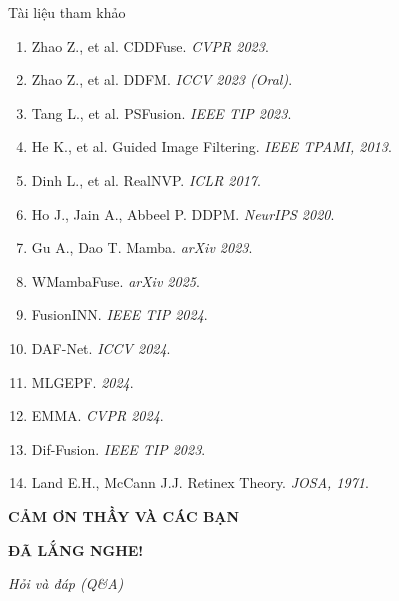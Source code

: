 \documentclass{beamer}
\begin{document}
\begin{frame}{Tài liệu tham khảo}
    \footnotesize
    \begin{enumerate}
        \item Zhao Z., et al. CDDFuse. \textit{CVPR 2023}.
        \item Zhao Z., et al. DDFM. \textit{ICCV 2023 (Oral)}.
        \item Tang L., et al. PSFusion. \textit{IEEE TIP 2023}.
        \item He K., et al. Guided Image Filtering. \textit{IEEE TPAMI, 2013}.
        \item Dinh L., et al. RealNVP. \textit{ICLR 2017}.
        \item Ho J., Jain A., Abbeel P. DDPM. \textit{NeurIPS 2020}.
        \item Gu A., Dao T. Mamba. \textit{arXiv 2023}.
        \item WMambaFuse. \textit{arXiv 2025}.
        \item FusionINN. \textit{IEEE TIP 2024}.
        \item DAF-Net. \textit{ICCV 2024}.
        \item MLGEPF. \textit{2024}.
        \item EMMA. \textit{CVPR 2024}.
        \item Dif-Fusion. \textit{IEEE TIP 2023}.
        \item Land E.H., McCann J.J. Retinex Theory. \textit{JOSA, 1971}.
    \end{enumerate}
\end{frame}

\begin{frame}
    \centering
    \Huge \textcolor{hustred}{\textbf{CẢM ƠN THẦY VÀ CÁC BẠN}}
    \vspace{0.5cm}

    \Large \textbf{ĐÃ LẮNG NGHE!}

    \vspace{1cm}
    \normalsize
    \textit{Hỏi và đáp (Q\&A)}
\end{frame}
\end{document}
